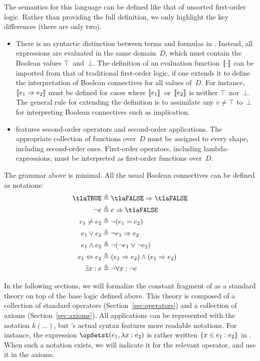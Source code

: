 \documentclass[11pt, a4paper, oneside]{article}
\begin{document}
The semantics for this language can be defined like that of unsorted first-order logic.  Rather than providing the full definition, we only highlight the key differences (there are only two).
\begin{itemize}
    \item There is no syntactic distinction between terms and formulas in \TLA.  Instead, all expressions are evaluated in the same domain~$D$, which must contain the Boolean values $\top$~and~$\bot$.  The definition of an evaluation function~$\left\llbracket \cdot \right\rrbracket$ can be imported from that of traditional first-order logic, if one extends it to define the interpretation of Boolean connectives for all values of~$D$.  For instance, $\left\llbracket e_1 \Rightarrow e_2 \right\rrbracket$ must be defined for cases where $\left\llbracket e_1 \right\rrbracket$~or~$\left\llbracket e_2 \right\rrbracket$ is neither $\top$~nor~$\bot$.  The general rule for extending the definition is to assimilate any $v \neq \top$ to~$\bot$ for interpreting Boolean connectives such as implication.
    \item \TLA features second-order operators and second-order applications.  The appropriate collection of functions over~$D$ must be assigned to every shape, including second-order ones.  First-order operators, including lambda-expressions, must be interpreted as first-order functions over~$D$.
\end{itemize}

The grammar above is minimal.  All the usual Boolean connectives can be defined as notations:
\begin{align*}
    \tlaTRUE        &\triangleq \tlaFALSE \imp \tlaFALSE \\
    \neg e          &\triangleq e \imp \tlaFALSE \\
    e_1 \neq e_2    &\triangleq \neg (e_1 = e_2) \\
    e_1 \vee e_2    &\triangleq \neg e_1 \imp e_2 \\
    e_1 \wedge e_2  &\triangleq \neg (\neg e_1 \vee \neg e_2) \\
    e_1 \eqv e_2    &\triangleq (e_1 \imp e_2) \wedge (e_1 \imp e_2) \\
    \exists x : e   &\triangleq \neg \forall x : \neg e
\end{align*}

In the following sections, we will formalize the constant fragment of \TLA as a standard theory on top of the base logic defined above.  This theory is composed of a collection of standard operators (Section~\ref{sec:operators}) and a collection of axioms (Section~\ref{sec:axioms}).  All applications can be represented with the notation $k(\ldots)$, but \TLA's actual syntax features more readable notations.  For instance, the expression $\opSetst(e_1, \lambda x : e_2)$ is rather written $\left\{  x \in e_1 : e_2  \right\}$ in \TLA.  When such a notation exists, we will indicate it for the relevant operator, and use it in the axioms.
\end{document}
